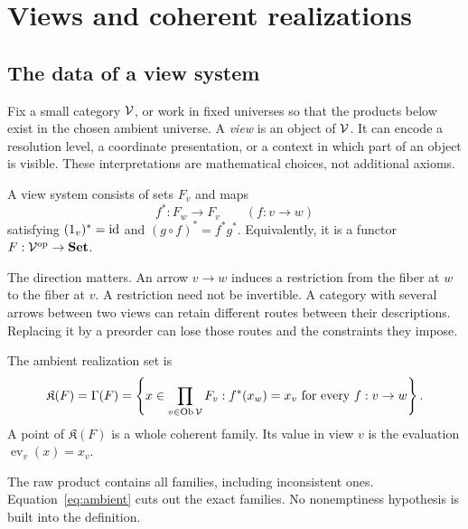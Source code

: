 \section{Views and coherent realizations}\label{sec:views}
\subsection{The data of a view system}
Fix a small category \(\mathcal V\), or work in fixed universes so that the products below exist in the chosen ambient universe. A \emph{view} is an object of \(\mathcal V\). It can encode a resolution level, a coordinate presentation, or a context in which part of an object is visible. These interpretations are mathematical choices, not additional axioms.

\begin{definition}
A view system consists of sets \(F_v\) and maps
\[
 f^*:F_w\longrightarrow F_v\qquad(f:v\longrightarrow w)
\]
satisfying \((1_v)^*=\operatorname{id}\) and \((g\circ f)^*=f^*g^*\). Equivalently, it is a functor \(F:\mathcal V^{\mathrm{op}}\to\mathbf{Set}\).
\end{definition}
The direction matters. An arrow \(v\to w\) induces a restriction from the fiber at \(w\) to the fiber at \(v\). A restriction need not be invertible. A category with several arrows between two views can retain different routes between their descriptions. Replacing it by a preorder can lose those routes and the constraints they impose.

\begin{definition}
The ambient realization set is
\begin{equation}\label{eq:ambient}
 \mathfrak K(F)=\Gamma(F)=
 \left\{x\in\prod_{v\in\operatorname{Ob}\mathcal V}F_v:
 f^*(x_w)=x_v\text{ for every }f:v\to w\right\}.
\end{equation}
A point of \(\mathfrak K(F)\) is a whole coherent family. Its value in view \(v\) is the evaluation \(\operatorname{ev}_v(x)=x_v\).
\end{definition}
The raw product contains all families, including inconsistent ones. Equation~\eqref{eq:ambient} cuts out the exact families. No nonemptiness hypothesis is built into the definition.


